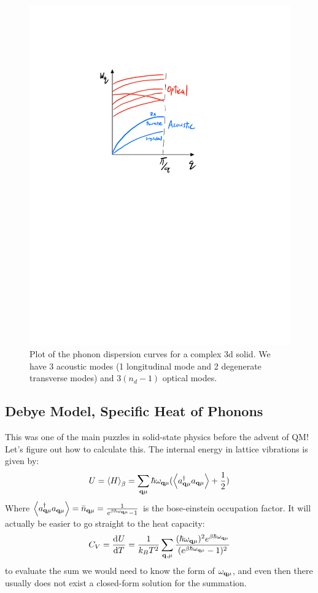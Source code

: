 \begin{figure}[htbp]
    \centering
    \includegraphics[scale=0.7]{Images/fig-3dphonondispersion.pdf}

    \caption{Plot of the phonon dispersion curves for a complex 3d solid. We have 3 acoustic modes (1 longitudinal mode and 2 degenerate transverse modes) and $3(n_d - 1)$ optical modes. }
    \label{fig-3dphonondispersion}
\end{figure}

\subsection{Debye Model, Specific Heat of Phonons}
This was one of the main puzzles in solid-state physics before the advent of QM! Let's figure out how to calculate this. The internal energy in lattice vibrations is given by:
\begin{equation}
    U = \left< H \right>_\beta = \sum_{\mathbf{q}\mu}\hbar \omega_{\mathbf{q}\mu}(\left< a^\dagger_{\mathbf{q}\mu}a_{\mathbf{q}\mu} \right> + \frac{1}{2})
\end{equation}
Where $\left< a^\dagger_{\mathbf{q}\mu}a_{\mathbf{q}\mu} \right> = \bar{n}_{\mathbf{q}\mu} = \frac{1}{e^{\beta \hbar \omega_{\mathbf{q}\mu}} - 1}$ is the bose-einstein occupation factor. It will actually be easier to go straight to the heat capacity:
\begin{equation}\label{eq-photonCV}
    C_V = \dod{U}{T} = \frac{1}{k_B T^2}\sum_{\v{q}, \mu}\frac{(\hbar \omega_{\v{q}\mu})^2 e^{\beta \hbar \omega_{\v{q}\mu}}}{(e^{\beta\hbar\omega_{\v{q}\mu}} - 1)^2}
\end{equation}
to evaluate the sum we would need to know the form of $\omega_{\mathbf{q}\mu}$, and even then there usually does not exist a closed-form solution for the summation.

